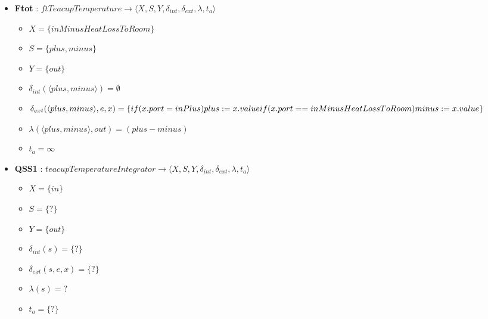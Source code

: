 \begin{itemize}
\item \textbf{Ftot} : $ ftTeacupTemperature \rightarrow \langle X, S, Y, \delta_{int}, \delta_{ext}, \lambda, t_{a} \rangle$ \newline
\begin{itemize}
	\item $ X = \{ inMinusHeatLossToRoom \} $ \newline
	\item $ S = \{ plus, minus \} $ \newline
	\item $ Y = \{ out \} $ \newline
	\item $ \delta_{int}(\langle plus, minus \rangle) = \emptyset $ \newline
	\item $ \delta_{ext}(\langle plus, minus \rangle, e, x) = \{ 
	\\if (x.port = inPlus) plus := x.value
	\\if (x.port == inMinusHeatLossToRoom) minus := x.value
	\} $ \newline
	\item $ \lambda(\langle plus, minus \rangle, out) = (plus - minus) $ \newline
	\item $ t_{a} = \infty $ 
\end{itemize}
\item \textbf{QSS1} : $ teacupTemperatureIntegrator \rightarrow \langle X, S, Y, \delta_{int}, \delta_{ext}, \lambda, t_{a} \rangle$ \newline
\begin{itemize}
	\item $ X = \{ in \} $ \newline
	\item $ S = \{ ? \} $ \newline
	\item $ Y = \{ out \} $ \newline
	\item $ \delta_{int}(s) = \{ ? \} $ \newline
	\item $ \delta_{ext}(s, e, x) = \{ ? \} $ \newline
	\item $ \lambda(s) = ? $ \newline
	\item $ t_{a} = \{ ? \} $ 
\end{itemize}
\end{itemize}

